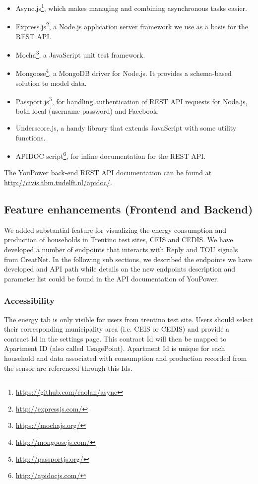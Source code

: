 \begin{itemize}
\item Async.js\footnote{\url{https://github.com/caolan/async}}, which makes managing and combining asynchronous tasks easier. 
\item Express.js\footnote{\url{http://expressjs.com/}}, a Node.js application server framework we use as a basis for the REST API. 
\item Mocha\footnote{\url{https://mochajs.org/}}, a JavaScript unit test framework. 
\item Mongoose\footnote{\url{http://mongoosejs.com/}}, a MongoDB driver for Node.js. It provides a schema-based solution to model data. 
\item Passport.js\footnote{\url{http://passportjs.org/}}, for handling authentication of REST API requests for Node.js, both local (username password) and Facebook. 
\item Underscore.js, a handy library that extends JavaScript with some utility functions. 
\item APIDOC script\footnote{\url{http://apidocjs.com/}}, for inline documentation for the REST API. 
\end{itemize}

The YouPower back-end REST API documentation can be found at {\footnotesize\url{http://civis.tbm.tudelft.nl/apidoc/}}. 
% 


\subsection{Feature enhancements (Frontend and Backend)}
We added substantial feature for visualizing the energy consumption and production of households in Trentino test sites, CEIS and CEDIS. We have developed a number of endpoints that interacts with Reply and  TOU signals from CreatNet. In the following sub sections, we described the endpoints we have developed and API path while details on the new endpoints description and parameter list could be found in the API documentation of YouPower.

\subsubsection{Accessibility}
The energy tab is only visible for users from trentino test site. Users should select their  corresponding municipality area (i.e. CEIS or CEDIS) and provide a contract Id in the settings page. This contract Id will then be mapped to Apartment ID (also called UsagePoint). Apartment Id is unique for each household and data associated with consumption and production recorded from the sensor are referenced through  this Ids.

